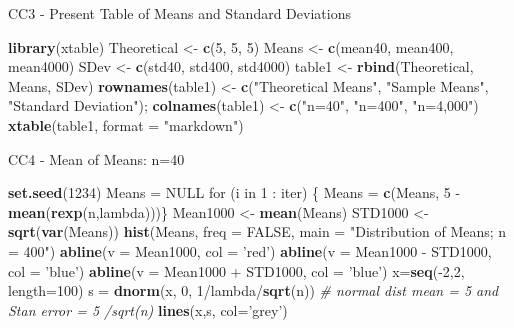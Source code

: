 \documentclass[]{article}
\newenvironment{Shaded}{\begin{snugshade}}{\end{snugshade}}
\newcommand{\KeywordTok}[1]{\textcolor[rgb]{0.13,0.29,0.53}{\textbf{{#1}}}}
\newcommand{\DataTypeTok}[1]{\textcolor[rgb]{0.13,0.29,0.53}{{#1}}}
\newcommand{\DecValTok}[1]{\textcolor[rgb]{0.00,0.00,0.81}{{#1}}}
\newcommand{\StringTok}[1]{\textcolor[rgb]{0.31,0.60,0.02}{{#1}}}
\newcommand{\CommentTok}[1]{\textcolor[rgb]{0.56,0.35,0.01}{\textit{{#1}}}}
\newcommand{\OtherTok}[1]{\textcolor[rgb]{0.56,0.35,0.01}{{#1}}}
\newcommand{\NormalTok}[1]{{#1}}
\begin{document}
CC3 - Present Table of Means and Standard Deviations

\begin{Shaded}
\begin{Highlighting}[]
\KeywordTok{library}\NormalTok{(xtable)}
\NormalTok{Theoretical <-}\StringTok{ }\KeywordTok{c}\NormalTok{(}\DecValTok{5}\NormalTok{, }\DecValTok{5}\NormalTok{, }\DecValTok{5}\NormalTok{)}
\NormalTok{Means <-}\StringTok{ }\KeywordTok{c}\NormalTok{(mean40, mean400, mean4000)}
\NormalTok{SDev <-}\StringTok{ }\KeywordTok{c}\NormalTok{(std40, std400, std4000)}
\NormalTok{table1 <-}\StringTok{ }\KeywordTok{rbind}\NormalTok{(Theoretical, Means, SDev)}
\KeywordTok{rownames}\NormalTok{(table1) <-}\StringTok{ }\KeywordTok{c}\NormalTok{(}\StringTok{"Theoretical Means"}\NormalTok{, }\StringTok{"Sample Means"}\NormalTok{, }\StringTok{"Standard Deviation"}\NormalTok{); }\KeywordTok{colnames}\NormalTok{(table1) <-}\StringTok{ }\KeywordTok{c}\NormalTok{(}\StringTok{"n=40"}\NormalTok{, }\StringTok{"n=400"}\NormalTok{, }\StringTok{"n=4,000"}\NormalTok{)}
\KeywordTok{xtable}\NormalTok{(table1, }\DataTypeTok{format =} \StringTok{"markdown"}\NormalTok{)}
\end{Highlighting}
\end{Shaded}

CC4 - Mean of Means: n=40

\begin{Shaded}
\begin{Highlighting}[]
\KeywordTok{set.seed}\NormalTok{(}\DecValTok{1234}\NormalTok{)}
\NormalTok{Means =}\StringTok{ }\OtherTok{NULL}
\NormalTok{for (i in }\DecValTok{1} \NormalTok{:}\StringTok{ }\NormalTok{iter) \{}
    \NormalTok{Means =}\StringTok{ }\KeywordTok{c}\NormalTok{(Means, }\DecValTok{5} \NormalTok{-}\StringTok{ }\KeywordTok{mean}\NormalTok{(}\KeywordTok{rexp}\NormalTok{(n,lambda)))\}}
\NormalTok{Mean1000 <-}\StringTok{ }\KeywordTok{mean}\NormalTok{(Means)}
\NormalTok{STD1000 <-}\StringTok{ }\KeywordTok{sqrt}\NormalTok{(}\KeywordTok{var}\NormalTok{(Means))}
\KeywordTok{hist}\NormalTok{(Means, }\DataTypeTok{freq =} \OtherTok{FALSE}\NormalTok{, }\DataTypeTok{main =} \StringTok{"Distribution of Means; n = 400"}\NormalTok{)}
\KeywordTok{abline}\NormalTok{(}\DataTypeTok{v =} \NormalTok{Mean1000, }\DataTypeTok{col =} \StringTok{'red'}\NormalTok{)}
\KeywordTok{abline}\NormalTok{(}\DataTypeTok{v =} \NormalTok{Mean1000 -}\StringTok{ }\NormalTok{STD1000, }\DataTypeTok{col =} \StringTok{'blue'}\NormalTok{)}
\KeywordTok{abline}\NormalTok{(}\DataTypeTok{v =} \NormalTok{Mean1000 +}\StringTok{ }\NormalTok{STD1000, }\DataTypeTok{col =} \StringTok{'blue'}\NormalTok{)}
\NormalTok{x=}\KeywordTok{seq}\NormalTok{(-}\DecValTok{2}\NormalTok{,}\DecValTok{2}\NormalTok{, }\DataTypeTok{length=}\DecValTok{100}\NormalTok{) }
\NormalTok{s =}\StringTok{ }\KeywordTok{dnorm}\NormalTok{(x, }\DecValTok{0}\NormalTok{, }\DecValTok{1}\NormalTok{/lambda/}\KeywordTok{sqrt}\NormalTok{(n)) }\CommentTok{# normal dist mean = 5 and Stan error = 5 /sqrt(n)  }
\KeywordTok{lines}\NormalTok{(x,s, }\DataTypeTok{col=}\StringTok{'grey'}\NormalTok{)}
\end{Highlighting}
\end{Shaded}
\end{document}

